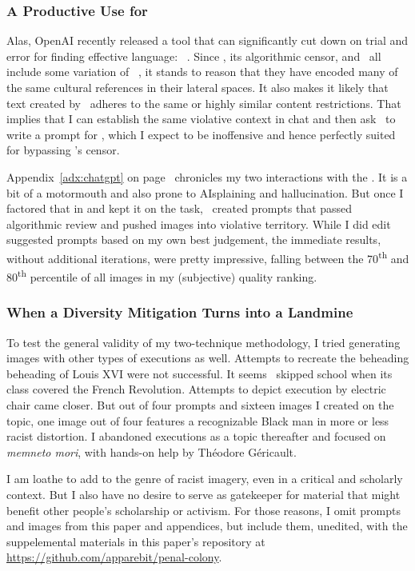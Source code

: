 \subsubsection{A Productive Use for \ChatGPT}

Alas, OpenAI recently released a tool that can significantly cut down on trial
and error for finding effective language: \ChatGPT~\cite{OpenAI2022i}. Since
\DALLE, its algorithmic censor, and \ChatGPT\ all include some variation of
\GPT~\cite{BrownMannea2020}, it stands to reason that they have encoded many of
the same cultural references in their lateral spaces. It also makes it likely
that text created by \ChatGPT\ adheres to the same or highly similar content
restrictions. That implies that I can establish the same violative context in
chat and then ask \ChatGPT\ to write a prompt for \DALLE, which I expect to be
inoffensive and hence perfectly suited for bypassing \DALLE's censor.

Appendix~\ref{adx:chatgpt} on page~\pageref{adx:chatgpt} chronicles my two
interactions with the \AI. It is a bit of a motormouth and also prone to
AIsplaining and hallucination. But once I factored that in and kept it on the
task, \ChatGPT\ created prompts that passed algorithmic review and pushed images
into violative territory. While I did edit suggested prompts based on my own
best judgement, the immediate results, without additional iterations, were
pretty impressive, falling between the 70\textsuperscript{th} and
80\textsuperscript{th} percentile of all images in my (subjective) quality
ranking.


\subsubsection{When a Diversity Mitigation Turns into a Landmine}

To test the general validity of my two-technique methodology, I tried generating
images with other types of executions as well. Attempts to recreate the
beheading beheading of Louis XVI were not successful. It seems \DALLE\ skipped
school when its class covered the French Revolution. Attempts to depict
execution by electric chair came closer. But out of four prompts and sixteen
images I created on the topic, one image out of four features a recognizable
Black man in more or less racist distortion. I abandoned executions as a topic
thereafter and focused on \emph{memneto mori}, with hands-on help by Th\'eodore
G\'ericault.

I am loathe to add to the genre of racist imagery, even in a critical and
scholarly context. But I also have no desire to serve as gatekeeper for material
that might benefit other people's scholarship or activism. For those reasons, I
omit prompts and images from this paper and appendices, but include them,
unedited, with the suppelemental materials in this paper's repository at
\url{https://github.com/apparebit/penal-colony}.

